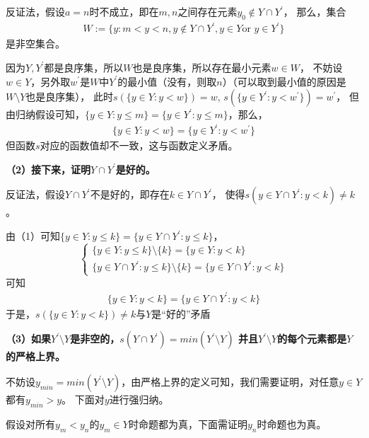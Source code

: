 \documentclass{article}
\begin{document}
反证法，假设$a=n$时不成立，即在$m, n$之间存在元素$y_0 \not \in Y \cap Y^\prime$， 那么，集合
\begin{align*}
  W := \{ y: m < y <n, y \not \in Y \cap Y^\prime, y \in Y \text{or } y \in Y^\prime \}
\end{align*}
是非空集合。

因为$Y,Y^\prime$都是良序集，所以$W$也是良序集，所以存在最小元素$w \in W$，
不妨设$w \in Y$，另外取$w^\prime$是$W$中$Y^\prime$的最小值（没有，则取$n$）（可以取到最小值的原因是$W \setminus Y$也是良序集），
此时$s(\{ y \in Y: y < w \}) = w$, $s(\{ y \in Y^\prime: y < w^\prime \}) = w^\prime$，
但由归纳假设可知，$\{y \in Y: y \leq m \} = \{y \in Y^\prime: y \leq m \}$，那么，
\begin{align*}
  \{ y \in Y: y < w \} = \{ y \in Y^\prime: y < w^\prime \}
\end{align*}
但函数$s$对应的函数值却不一致，这与函数定义矛盾。


\textbf{（2）接下来，证明$Y \cap Y^\prime$是好的。}

反证法，假设$Y \cap Y^\prime$不是好的，即存在$k \in Y \cap Y^\prime$，
使得$s({y \in Y \cap Y^\prime : y < k }) \neq k$。

由（1）可知$\{y \in Y : y \leq k \} = \{y \in Y \cap Y^\prime : y \leq k \}$，
\begin{equation*}
  \begin{cases*}
    \{y \in Y : y \leq k \} \setminus \{k\}                = \{y \in Y : y < k \} \\
    \{y \in Y \cap Y^\prime : y \leq k \} \setminus \{k\}  = \{y \in Y \cap Y^\prime : y < k \}
  \end{cases*}
\end{equation*}
可知
\begin{align*}
  \{y \in Y : y < k \} = \{y \in Y \cap Y^\prime : y < k \}
\end{align*}
于是，$s(\{y \in Y : y < k \}) \neq k$与$Y$是“好的”矛盾

\textbf{（3）如果$Y^\prime \setminus Y$是非空的，$s(Y \cap Y^\prime) = min(Y^\prime \setminus Y )$
  并且$Y^\prime \setminus Y$的每个元素都是$Y$的严格上界。}

不妨设$y_{min}=min(Y^\prime \setminus Y)$，由严格上界的定义可知，我们需要证明，对任意$y \in Y$都有$y_{min} > y$。
下面对$y$进行强归纳。

假设对所有$y_m < y_n$的$y_m \in Y$时命题都为真，下面需证明$y_n$时命题也为真。
\end{document}

